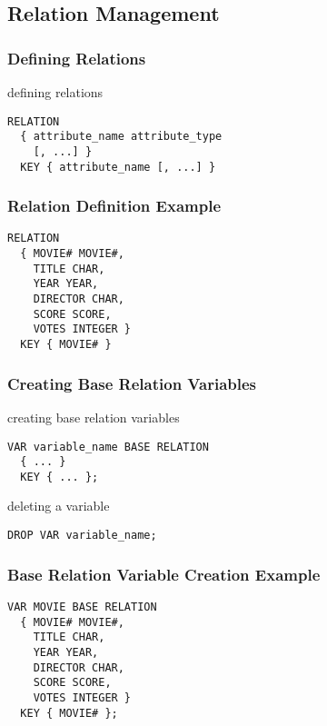 \documentclass[dvipsnames]{beamer}
\theoremstyle{plain}
\begin{document}
\subsection{Relation Management}

\begin{frame}[fragile]
  \frametitle{Defining Relations}

  \begin{block}{defining relations}
    \begin{lstlisting}
RELATION
  { attribute_name attribute_type
    [, ...] }
  KEY { attribute_name [, ...] }
    \end{lstlisting}
  \end{block}
\end{frame}

\begin{frame}[fragile]
  \frametitle{Relation Definition Example}

  \begin{example}
    \begin{lstlisting}
RELATION
  { MOVIE# MOVIE#,
    TITLE CHAR,
    YEAR YEAR,
    DIRECTOR CHAR,
    SCORE SCORE,
    VOTES INTEGER }
  KEY { MOVIE# }
    \end{lstlisting}
  \end{example}
\end{frame}

\begin{frame}[fragile]
  \frametitle{Creating Base Relation Variables}

  \begin{block}{creating base relation variables}
    \begin{lstlisting}
VAR variable_name BASE RELATION
  { ... }
  KEY { ... };
    \end{lstlisting}
  \end{block}

  \pause
  \begin{block}{deleting a variable}
    \begin{lstlisting}
DROP VAR variable_name;
    \end{lstlisting}
  \end{block}
\end{frame}

\begin{frame}[fragile]
  \frametitle{Base Relation Variable Creation Example}

  \begin{example}
    \begin{lstlisting}
VAR MOVIE BASE RELATION
  { MOVIE# MOVIE#,
    TITLE CHAR,
    YEAR YEAR,
    DIRECTOR CHAR,
    SCORE SCORE,
    VOTES INTEGER }
  KEY { MOVIE# };
    \end{lstlisting}
  \end{example}
\end{frame}
\end{document}
